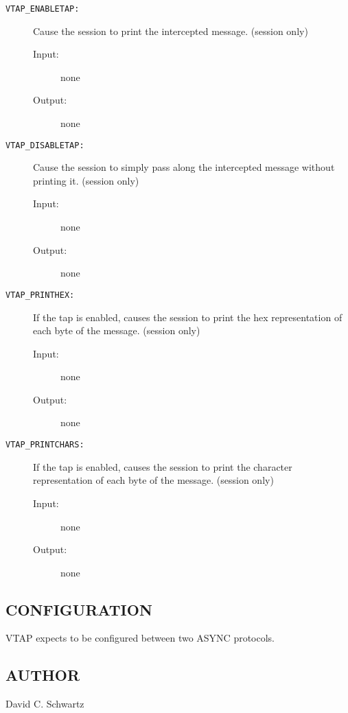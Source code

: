 \begin{description}

\item[{\tt VTAP\_ENABLETAP:}]
Cause the session to print the intercepted message.  
(session only)
\begin{description}
\item[{\rm Input:}] none
\item[{\rm Output:}] none
\end{description}

\item[{\tt VTAP\_DISABLETAP:}]
Cause the session to simply pass along the intercepted message without
printing it.
(session only) 
\begin{description}
\item[{\rm Input:}] none
\item[{\rm Output:}] none
\end{description}

\item[{\tt VTAP\_PRINTHEX:}]
If the tap is enabled, causes the session to print the hex
representation of each byte of the message.
(session only)
\begin{description}
\item[{\rm Input:}] none
\item[{\rm Output:}] none
\end{description}

\item[{\tt VTAP\_PRINTCHARS:}]
If the tap is enabled, causes the session to print the character
representation of each byte of the message.
(session only) 
\begin{description}
\item[{\rm Input:}] none
\item[{\rm Output:}] none
\end{description}

\end{description}

\subsection*{CONFIGURATION}

VTAP expects to be configured between two ASYNC protocols.

\subsection*{AUTHOR}

\noindent David C. Schwartz



